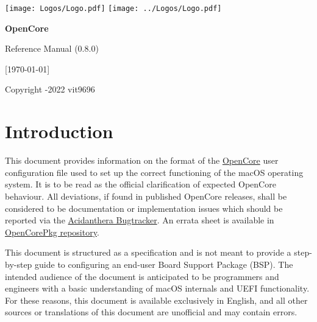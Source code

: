 \documentclass[]{article}
\begin{document}
\begin{titlepage}
   \begin{center}
       \vspace*{2.0in}

       \Huge

         {\texttt{[image: Logos/Logo.pdf]}}
         {\texttt{[image: ../Logos/Logo.pdf]}}

       \sffamily

       \textbf{OpenCore}

       \vspace{0.2in}

       Reference Manual (0.8.0)

       \vspace{0.2in}

        {[}\today{]}

       \normalsize

       \vfill

       \rmfamily

       Copyright -2022 vit9696

   \end{center}
\end{titlepage}

\tableofcontents

\section{Introduction}\label{introduction}

This document provides information on the format of the
\href{https://github.com/acidanthera/OpenCorePkg}{OpenCore} user
configuration file used to set up the correct functioning of the macOS
operating system. It is to be read as the official clarification of expected
OpenCore behaviour. All deviations, if found in published OpenCore releases,
shall be considered to be documentation or implementation issues which should be
reported via the \href{https://github.com/acidanthera/bugtracker}{Acidanthera Bugtracker}.
An errata sheet is available in
\href{https://github.com/acidanthera/OpenCorePkg/blob/master/Docs/Errata/Errata.pdf}{OpenCorePkg repository}.

This document is structured as a specification and is not meant to provide a step-by-step
guide to configuring an end-user Board Support Package (BSP). The intended audience
of the document is anticipated to be programmers and engineers with a basic understanding of macOS internals
and UEFI functionality. For these reasons, this document is available exclusively in English,
and all other sources or translations of this document are unofficial and may
contain errors.
\end{document}
